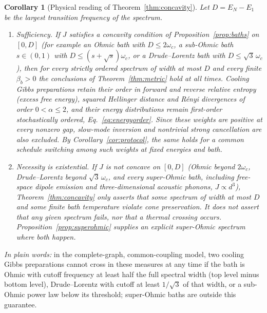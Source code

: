 \documentclass[11pt,a4paper]{article}
\newtheorem{corollary}[theorem]{Corollary}
\theoremstyle{remark}\newtheorem{remark}[theorem]{Remark}
\newcommand{\takeaway}[1]{\par\smallskip\noindent\textit{In plain words:} #1\par\smallskip}
\begin{document}
\begin{corollary}[Physical reading of Theorem~\ref{thm:concavity}]\label{cor:baths}
Let $D=E_N-E_1$ be the largest transition frequency of the spectrum.
\begin{enumerate}[label=(\roman*)]
\item \emph{Sufficiency.} If $J$ satisfies a concavity condition of Proposition~\ref{prop:baths} on $[0,D]$ (for example an Ohmic bath with $D\le2\omega_c$, a sub-Ohmic bath $s\in(0,1)$ with $D\le(s+\sqrt s)\omega_c$, or a Drude--Lorentz bath with $D\le\sqrt3\,\omega_c$), then for \emph{every} strictly ordered spectrum of width at most $D$ and every finite $\beta_b>0$ the conclusions of Theorem~\ref{thm:metric} hold at all times. Cooling Gibbs preparations retain their order in forward and reverse relative entropy (excess free energy), squared Hellinger distance and R\'enyi divergences of order $0<\alpha\le2$, and their energy distributions remain first-order stochastically ordered, Eq.~\eqref{eq:energyorder}. Since these weights are positive at every nonzero gap, slow-mode inversion and nontrivial strong cancellation are also excluded. By Corollary~\ref{cor:protocol}, the same holds for a common schedule switching among such weights at fixed energies and bath.
\item \emph{Necessity is existential.} If $J$ is not concave on $[0,D]$ (Ohmic beyond $2\omega_c$, Drude--Lorentz beyond $\sqrt3\,\omega_c$, and every super-Ohmic bath, including free-space dipole emission and three-dimensional acoustic phonons, $J\propto d^3$), Theorem~\ref{thm:concavity} only asserts that \emph{some} spectrum of width at most $D$ and \emph{some} finite bath temperature violate cone preservation. It does not assert that any given spectrum fails, nor that a thermal crossing occurs. Proposition~\ref{prop:superohmic} supplies an explicit super-Ohmic spectrum where both happen.
\end{enumerate}
\end{corollary}
\takeaway{in the complete-graph, common-coupling model, two cooling Gibbs preparations cannot cross in these measures at any time if the bath is Ohmic with cutoff frequency at least half the full spectral width (top level minus bottom level), Drude--Lorentz with cutoff at least $1/\sqrt3$ of that width, or a sub-Ohmic power law below its threshold; super-Ohmic baths are outside this guarantee.}
\end{document}
